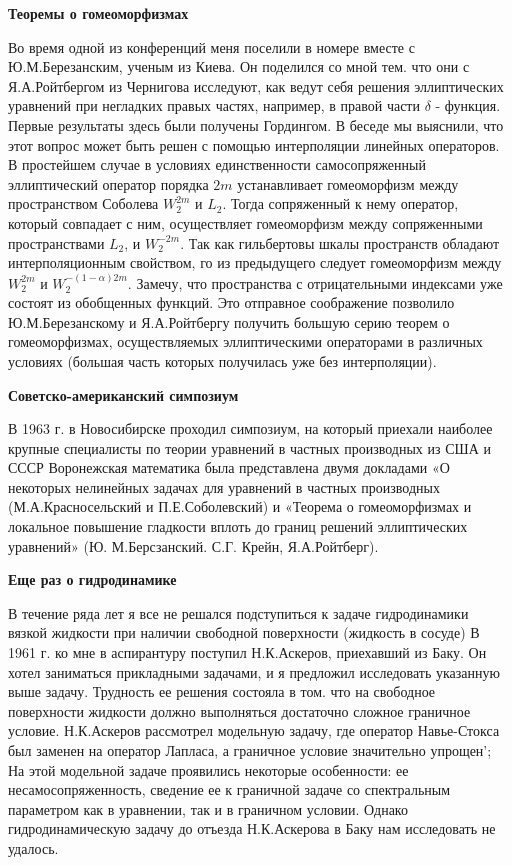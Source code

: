 {\bf Теоремы о гомеоморфизмах}

Во время одной из конференций меня поселили в номере вместе с Ю.М.Березанским, ученым из Киева. Он поделился со мной тем. что они с Я.А.Ройтбергом из Чернигова исследуют, как ведут себя решения эллиптических уравнений при негладких правых частях, например, в правой части $\delta$ - функция. Первые результаты здесь были получены Гордингом. В беседе мы выяснили, что этот вопрос может быть решен с помощью интерполяции линейных операторов. В простейшем случае в условиях единственности самосопряженный эллиптический оператор порядка $2m$ устанавливает гомеоморфизм между пространством Соболева $W_2^{2m}$ и $L_2$. Тогда сопряженный к нему оператор, который совпадает с ним, осуществляет гомеоморфизм между сопряженными пространствами $L_2$, и $W_2^{-2m}$. Так как гильбертовы шкалы пространств обладают интерполяционным свойством, го из предыдущего следует гомеоморфизм между $W_2^{2m}$ и $W_2^{-(1-\alpha)2m}$. Замечу, что пространства с отрицательными индексами уже состоят из обобщенных функций. Это отправное соображение позволило Ю.М.Березанскому и Я.А.Ройтбергу получить большую серию теорем о гомеоморфизмах, осуществляемых эллиптическими операторами в различных условиях (большая часть которых получилась уже без интерполяции).

{\bf Советско-американский симпозиум}

В 1963 г. в Новосибирске проходил симпозиум, на который приехали наиболее крупные специалисты по теории уравнений в частных производных из США и СССР Воронежская математика была представлена двумя докладами «О некоторых нелинейных задачах для уравнений в частных производных (М.А.Красносельский и П.Е.Соболевский) и «Теорема о гомеоморфизмах и локальное повышение гладкости вплоть до границ решений эллиптических уравнений» (Ю. М.Берсзанский. С.Г. Крейн, Я.А.Ройтберг).

{\bf Еще раз о гидродинамике}

В течение ряда лет я все не решался подступиться к задаче гидродинамики вязкой жидкости при наличии свободной поверхности (жидкость в сосуде) В 1961 г. ко мне в аспирантуру поступил Н.К.Аскеров, приехавший из Баку. Он хотел заниматься прикладными задачами, и я предложил исследовать указанную выше задачу. Трудность ее решения состояла в том. что на свободное поверхности жидкости должно выполняться достаточно сложное граничное условие. Н.К.Аскеров рассмотрел модельную задачу, где оператор Навье-Стокса был заменен на оператор Лапласа, а граничное условие значительно упрощен'; На этой модельной задаче проявились некоторые особенности: ее несамосопряженность, сведение ее к граничной задаче со спектральным параметром как в уравнении, так и в граничном условии. Однако гидродинамическую задачу до отъезда Н.К.Аскерова в Баку нам исследовать не удалось.

